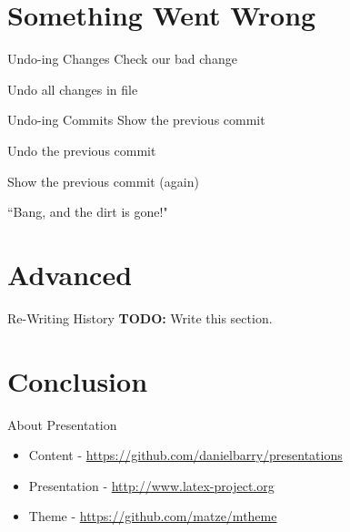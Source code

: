 \documentclass{beamer}
\begin{document}
  \section{Something Went Wrong}
  \begin{frame}[fragile=singleslide]{Undo-ing Changes}
    Check our bad change
    
    Undo all changes in file
    
  \end{frame}
  \begin{frame}[fragile=singleslide]{Undo-ing Commits}
    Show the previous commit
    
    Undo the previous commit
    
  \end{frame}
  \begin{frame}[fragile=singleslide]
    Show the previous commit (again)
    
    ``Bang, and the dirt is gone!"
  \end{frame}
  \section{Advanced}
  \begin{frame}{Re-Writing History}
    \textbf{TODO:} Write this section.
  \end{frame}
  \section{Conclusion}
  \begin{frame}{About Presentation}
    \begin{itemize}
      \item Content - \url{https://github.com/danielbarry/presentations}
      \item Presentation - \url{http://www.latex-project.org}
      \item Theme - \url{https://github.com/matze/mtheme}
    \end{itemize}
  \end{frame}
\end{document}
